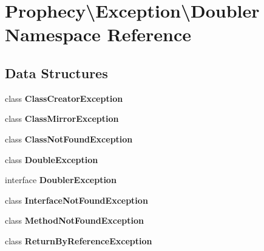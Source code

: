 \section{Prophecy\textbackslash{}Exception\textbackslash{}Doubler Namespace Reference}
\label{namespace_prophecy_1_1_exception_1_1_doubler}
\subsection*{Data Structures}
\begin{DoxyCompactItemize}
\item 
class {\bf Class\+Creator\+Exception}
\item 
class {\bf Class\+Mirror\+Exception}
\item 
class {\bf Class\+Not\+Found\+Exception}
\item 
class {\bf Double\+Exception}
\item 
interface {\bf Doubler\+Exception}
\item 
class {\bf Interface\+Not\+Found\+Exception}
\item 
class {\bf Method\+Not\+Found\+Exception}
\item 
class {\bf Return\+By\+Reference\+Exception}
\end{DoxyCompactItemize}
